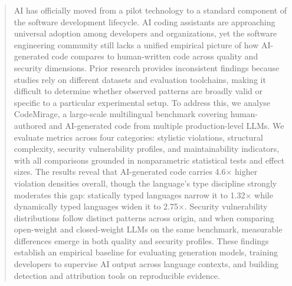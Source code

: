 \begin{abstract}
AI has officially moved from a pilot technology to a standard component of the software development lifecycle. AI coding assistants are approaching universal adoption among developers and organizations, yet the software engineering community still lacks a unified empirical picture of how AI-generated code compares to human-written code across quality and security dimensions. Prior research provides inconsistent findings because studies rely on different datasets and evaluation toolchains, making it difficult to determine whether observed patterns are broadly valid or specific to a particular experimental setup. To address this, we analyse CodeMirage, a large-scale multilingual benchmark covering human-authored and AI-generated code from multiple production-level LLMs. We evaluate metrics across four categories: stylistic violations, structural complexity, security vulnerability profiles, and maintainability indicators, with all comparisons grounded in nonparametric statistical tests and effect sizes. The results reveal that AI-generated code carries 4.6$\times$ higher violation densities overall, though the language's type discipline strongly moderates this gap: statically typed languages narrow it to 1.32$\times$ while dynamically typed languages widen it to 2.75$\times$. Security vulnerability distributions follow distinct patterns across origin, and when comparing open-weight and closed-weight LLMs on the same benchmark, measurable differences emerge in both quality and security profiles. These findings establish an empirical baseline for evaluating generation models, training developers to supervise AI output across language contexts, and building detection and attribution tools on reproducible evidence.
\end{abstract}
